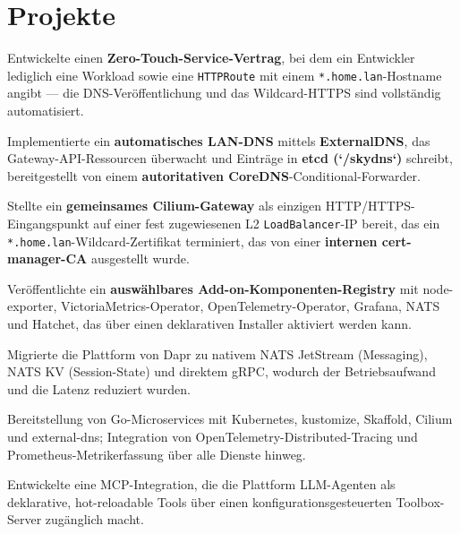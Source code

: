 \documentclass[10pt,a4paper]{resume}
\begin{document}
\vspace{2pt}

\section{Projekte}

\bullets
  \item Entwickelte einen \textbf{Zero-Touch-Service-Vertrag}, bei dem ein Entwickler lediglich eine Workload sowie eine \texttt{HTTPRoute} mit einem \texttt{*.home.lan}-Hostname angibt — die DNS-Veröffentlichung und das Wildcard-HTTPS sind vollständig automatisiert.
  \item Implementierte ein \textbf{automatisches LAN-DNS} mittels \textbf{ExternalDNS}, das Gateway-API-Ressourcen überwacht und Einträge in \textbf{etcd (`/skydns`)} schreibt, bereitgestellt von einem \textbf{autoritativen CoreDNS}-Conditional-Forwarder.
  \item Stellte ein \textbf{gemeinsames Cilium-Gateway} als einzigen HTTP/HTTPS-Eingangspunkt auf einer fest zugewiesenen L2 \texttt{LoadBalancer}-IP bereit, das ein \texttt{*.home.lan}-Wildcard-Zertifikat terminiert, das von einer \textbf{internen cert-manager-CA} ausgestellt wurde.
  \item Veröffentlichte ein \textbf{auswählbares Add-on-Komponenten-Registry} mit node-exporter, VictoriaMetrics-Operator, OpenTelemetry-Operator, Grafana, NATS und Hatchet, das über einen deklarativen Installer aktiviert werden kann.
\bulletsend
\vspace{1.0pt}
\bullets
  \item Migrierte die Plattform von Dapr zu nativem NATS JetStream (Messaging), NATS KV (Session-State) und direktem gRPC, wodurch der Betriebsaufwand und die Latenz reduziert wurden.
  \item Bereitstellung von Go-Microservices mit Kubernetes, kustomize, Skaffold, Cilium und external-dns; Integration von OpenTelemetry-Distributed-Tracing und Prometheus-Metrikerfassung über alle Dienste hinweg.
  \item Entwickelte eine MCP-Integration, die die Plattform LLM-Agenten als deklarative, hot-reloadable Tools über einen konfigurationsgesteuerten Toolbox-Server zugänglich macht.
\bulletsend
\end{document}
